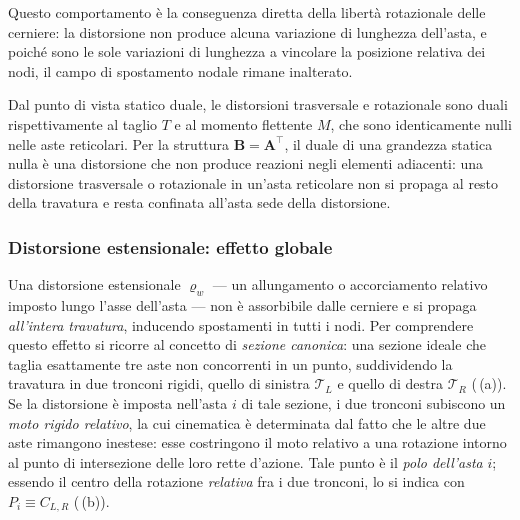 Questo comportamento è la conseguenza diretta della
libertà rotazionale delle cerniere: la distorsione
non produce alcuna variazione di lunghezza dell'asta,
e poiché sono le sole variazioni di lunghezza a
vincolare la posizione relativa dei nodi, il campo
di spostamento nodale rimane inalterato.

Dal punto di vista statico duale, le distorsioni
trasversale e rotazionale sono duali rispettivamente
al taglio $T$ e al momento flettente $M$, che sono
identicamente nulli nelle aste reticolari. Per la
struttura $\bm{B} = \bm{A}^\top$, il duale di una
grandezza statica nulla è una distorsione che non
produce reazioni negli elementi adiacenti: una
distorsione trasversale o rotazionale in un'asta
reticolare non si propaga al resto della travatura
e resta confinata all'asta sede della distorsione.


\subsubsection{Distorsione estensionale: effetto globale}
Una distorsione estensionale $\varrho_w$ --- un allungamento o
accorciamento relativo imposto lungo l'asse dell'asta --- non è
assorbibile dalle cerniere e si propaga \emph{all'intera travatura},
inducendo spostamenti in tutti i nodi. Per comprendere questo effetto
si ricorre al concetto di \emph{sezione canonica}: una sezione ideale
che taglia esattamente tre aste non concorrenti in un punto, 
suddividendo la travatura in due tronconi rigidi,
quello di sinistra $\mathcal{T}_L$ e quello di destra
$\mathcal{T}_R$ (\,(a)).
Se la distorsione è imposta nell'asta
$i$ di tale sezione, i due tronconi subiscono un \emph{moto rigido
	relativo}, la cui cinematica è determinata dal fatto che le altre due
aste rimangono inestese: esse costringono il moto relativo a una
rotazione intorno al punto di intersezione delle loro rette d'azione.
Tale punto è il \emph{polo dell'asta} $i$; essendo il centro della
rotazione \emph{relativa} fra i due tronconi, lo si indica con
$P_i\equiv C_{L,R}$ (\,(b)).

